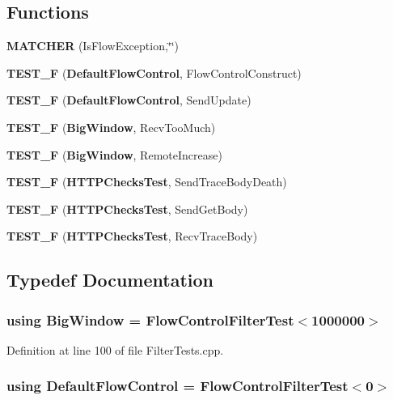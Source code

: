 \subsection*{Functions}
\begin{DoxyCompactItemize}
\item 
{\bf M\+A\+T\+C\+H\+ER} (Is\+Flow\+Exception,\char`\"{}\char`\"{})
\item 
{\bf T\+E\+S\+T\+\_\+F} ({\bf Default\+Flow\+Control}, Flow\+Control\+Construct)
\item 
{\bf T\+E\+S\+T\+\_\+F} ({\bf Default\+Flow\+Control}, Send\+Update)
\item 
{\bf T\+E\+S\+T\+\_\+F} ({\bf Big\+Window}, Recv\+Too\+Much)
\item 
{\bf T\+E\+S\+T\+\_\+F} ({\bf Big\+Window}, Remote\+Increase)
\item 
{\bf T\+E\+S\+T\+\_\+F} ({\bf H\+T\+T\+P\+Checks\+Test}, Send\+Trace\+Body\+Death)
\item 
{\bf T\+E\+S\+T\+\_\+F} ({\bf H\+T\+T\+P\+Checks\+Test}, Send\+Get\+Body)
\item 
{\bf T\+E\+S\+T\+\_\+F} ({\bf H\+T\+T\+P\+Checks\+Test}, Recv\+Trace\+Body)
\end{DoxyCompactItemize}


\subsection{Typedef Documentation}
\subsubsection[{Big\+Window}]{\setlength{\rightskip}{0pt plus 5cm}using {\bf Big\+Window} =  {\bf Flow\+Control\+Filter\+Test}$<$1000000$>$}\label{FilterTests_8cpp_af90eaf653cc2c60e496f0dd2068e4b25}


Definition at line 100 of file Filter\+Tests.\+cpp.

\subsubsection[{Default\+Flow\+Control}]{\setlength{\rightskip}{0pt plus 5cm}using {\bf Default\+Flow\+Control} =  {\bf Flow\+Control\+Filter\+Test}$<$0$>$}\label{FilterTests_8cpp_a0bd48c0f910bb259dd310f0143cd6df9}


